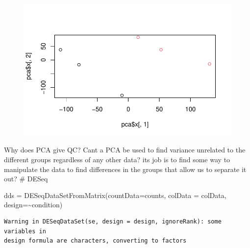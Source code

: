 \documentclass[
  letterpaper,
  DIV=11,
  numbers=noendperiod]{scrartcl}
\newenvironment{Shaded}{\begin{snugshade}}{\end{snugshade}}
\newcommand{\AttributeTok}[1]{\textcolor[rgb]{0.40,0.45,0.13}{#1}}
\newcommand{\DecValTok}[1]{\textcolor[rgb]{0.68,0.00,0.00}{#1}}
\newcommand{\FunctionTok}[1]{\textcolor[rgb]{0.28,0.35,0.67}{#1}}
\newcommand{\NormalTok}[1]{\textcolor[rgb]{0.00,0.23,0.31}{#1}}
\newcommand{\OtherTok}[1]{\textcolor[rgb]{0.00,0.23,0.31}{#1}}
\newcommand{\SpecialCharTok}[1]{\textcolor[rgb]{0.37,0.37,0.37}{#1}}
\begin{document}
\begin{Shaded}
\end{Shaded}

\begin{figure}[H]

{\centering \includegraphics{class_13_files/figure-pdf/unnamed-chunk-7-1.pdf}

}

\end{figure}

Why does PCA give QC? Cant a PCA be used to find variance unrelated to
the different groups regardless of any other data? its job is to find
some way to manipulate the data to find differences in the groups that
allow us to separate it out? \# DESeq

\begin{Shaded}
\begin{Highlighting}[]
\NormalTok{dds }\OtherTok{=} \FunctionTok{DESeqDataSetFromMatrix}\NormalTok{(}\AttributeTok{countData=}\NormalTok{counts,}
                             \AttributeTok{colData =}\NormalTok{ colData,}
                             \AttributeTok{design=}\SpecialCharTok{\textasciitilde{}}\NormalTok{condition)}
\end{Highlighting}
\end{Shaded}

\begin{verbatim}
Warning in DESeqDataSet(se, design = design, ignoreRank): some variables in
design formula are characters, converting to factors
\end{verbatim}
\end{document}
